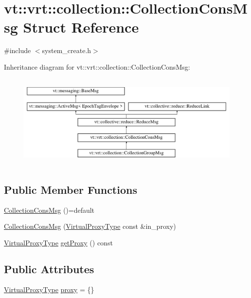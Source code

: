 \hypertarget{structvt_1_1vrt_1_1collection_1_1_collection_cons_msg}{}\section{vt\+:\+:vrt\+:\+:collection\+:\+:Collection\+Cons\+Msg Struct Reference}
\label{structvt_1_1vrt_1_1collection_1_1_collection_cons_msg}


{\ttfamily \#include $<$system\+\_\+create.\+h$>$}

Inheritance diagram for vt\+:\+:vrt\+:\+:collection\+:\+:Collection\+Cons\+Msg\+:\begin{figure}[H]
\begin{center}
\leavevmode
\includegraphics[height=4.745763cm]{structvt_1_1vrt_1_1collection_1_1_collection_cons_msg}
\end{center}
\end{figure}
\subsection*{Public Member Functions}
\begin{DoxyCompactItemize}
\item 
\hyperlink{structvt_1_1vrt_1_1collection_1_1_collection_cons_msg_af0c627a9c74cb19c0aa142fa650ed4eb}{Collection\+Cons\+Msg} ()=default
\item 
\hyperlink{structvt_1_1vrt_1_1collection_1_1_collection_cons_msg_a86c701bab38600f7624466909a37925e}{Collection\+Cons\+Msg} (\hyperlink{namespacevt_a1b417dd5d684f045bb58a0ede70045ac}{Virtual\+Proxy\+Type} const \&in\+\_\+proxy)
\item 
\hyperlink{namespacevt_a1b417dd5d684f045bb58a0ede70045ac}{Virtual\+Proxy\+Type} \hyperlink{structvt_1_1vrt_1_1collection_1_1_collection_cons_msg_a53a70b2333e8bd56e4a8c72c76b35283}{get\+Proxy} () const
\end{DoxyCompactItemize}
\subsection*{Public Attributes}
\begin{DoxyCompactItemize}
\item 
\hyperlink{namespacevt_a1b417dd5d684f045bb58a0ede70045ac}{Virtual\+Proxy\+Type} \hyperlink{structvt_1_1vrt_1_1collection_1_1_collection_cons_msg_aa059f3f1cab01c7858b13752eae287d5}{proxy} = \{\}
\end{DoxyCompactItemize}
